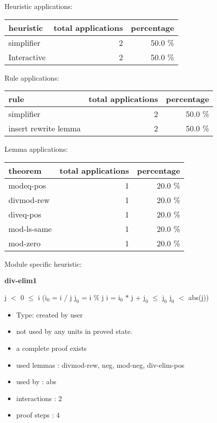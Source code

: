 \documentclass[a4paper]{article}
\begin{document}
\medskip


Heuristic applications:

\begin{supertabular}{l|r|r}
heuristic	& total applications & percentage \\ \hline
simplifier & 2 & 50.0 \% \\
Interactive & 2 & 50.0 \% \\

\end{supertabular}

Rule applications:

\begin{supertabular}{l|r|r}
rule	        & total applications & percentage \\ \hline
simplifier & 2 & 50.0 \% \\
insert rewrite lemma & 2 & 50.0 \% \\

\end{supertabular}

Lemma applications:

\begin{supertabular}{l|r|r}
theorem	        & total applications & percentage \\ \hline
modeq-pos & 1 & 20.0 \% \\
divmod-rew & 1 & 20.0 \% \\
diveq-pos & 1 & 20.0 \% \\
mod-ls-same & 1 & 20.0 \% \\
mod-zero & 1 & 20.0 \% \\

\end{supertabular}

Module specific heuristic:

\pagebreak

{\LARGE\bf div-elim1}\label{lemma-div-elim1}

\medskip

 \Fol j $<$ 0  $\le$ i \Imp ($\mbox{i}_{0}$ = i / j \And $\mbox{j}_{0}$ = i \% j \Equiv i = $\mbox{i}_{0}$ $*$ j + $\mbox{j}_{0}$  $\le$ $\mbox{j}_{0}$ \And $\mbox{j}_{0}$ $<$ abs(j))

\begin{itemize}

\item Type: created by user

\item not used by any units in proved state.
\item       a complete proof exists
\item       used lemmas  : divmod-rew, neg, mod-neg, div-elim-pos
\item       used by      : abs
\item       interactions : 2
\item       proof steps  : 4
\end{itemize}
\end{document}
